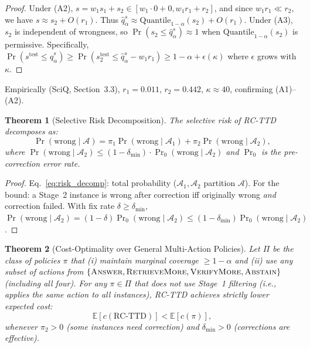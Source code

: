 \documentclass[letterpaper]{article}
\newtheorem{theorem}{Theorem}
\begin{document}
\begin{proof}
Under (A2), $s = w_1 s_1 + s_2 \in [w_1 \cdot 0 + 0, w_1 r_1 + r_2]$, and since $w_1 r_1 \ll r_2$, we have $s \approx s_2 + O(r_1)$. Thus $\hat{q}_\alpha^s \approx \text{Quantile}_{1-\alpha}(s_2) + O(r_1)$. Under (A3), $s_2$ is independent of wrongness, so $\Pr(s_2 \leq \hat{q}_\alpha^s) \approx 1$ when $\text{Quantile}_{1-\alpha}(s_2)$ is permissive. Specifically, $\Pr(s^{\text{test}} \leq \hat{q}_\alpha^s) \geq \Pr(s_2^{\text{test}} \leq \hat{q}_\alpha^s - w_1 r_1) \geq 1 - \alpha + \epsilon(\kappa)$ where $\epsilon$ grows with $\kappa$.
\end{proof}

Empirically (SciQ, Section~3.3), $r_1 = 0.011$, $r_2 = 0.442$, $\kappa \approx 40$, confirming (A1)--(A2).

\begin{theorem}[Selective Risk Decomposition]
\label{thm:risk}
The selective risk of RC-TTD decomposes as:
\begin{equation}
\Pr(\text{wrong} \mid \mathcal{A}) = \pi_1 \Pr(\text{wrong} \mid \mathcal{A}_1) + \pi_2 \Pr(\text{wrong} \mid \mathcal{A}_2),
\label{eq:risk_decomp}
\end{equation}
where $\Pr(\text{wrong} \mid \mathcal{A}_2) \leq (1 - \delta_{\min}) \cdot \Pr_0(\text{wrong} \mid \mathcal{A}_2)$ and $\Pr_0$ is the pre-correction error rate.
\end{theorem}

\begin{proof}
Eq.~\eqref{eq:risk_decomp}: total probability ($\mathcal{A}_1, \mathcal{A}_2$ partition $\mathcal{A}$). For the bound: a Stage~2 instance is wrong after correction iff originally wrong \emph{and} correction failed. With fix rate $\delta \geq \delta_{\min}$, $\Pr(\text{wrong} \mid \mathcal{A}_2) = (1{-}\delta)\Pr_0(\text{wrong} \mid \mathcal{A}_2) \leq (1{-}\delta_{\min})\Pr_0(\text{wrong} \mid \mathcal{A}_2)$.
\end{proof}

\begin{theorem}[Cost-Optimality over General Multi-Action Policies]
\label{thm:cost}
Let $\Pi$ be the class of policies $\pi$ that (i) maintain marginal coverage $\geq 1{-}\alpha$ and (ii) use any subset of actions from $\{\textsc{Answer}, \textsc{RetrieveMore}, \textsc{VerifyMore}, \textsc{Abstain}\}$ (including all four). For any $\pi \in \Pi$ that does not use Stage~1 filtering (i.e., applies the same action to all instances), RC-TTD achieves strictly lower expected cost:
\begin{equation}
\mathbb{E}[c(\text{RC-TTD})] < \mathbb{E}[c(\pi)],
\label{eq:cost_optimal}
\end{equation}
whenever $\pi_2 > 0$ (some instances need correction) and $\delta_{\min} > 0$ (corrections are effective).
\end{theorem}
\end{document}
